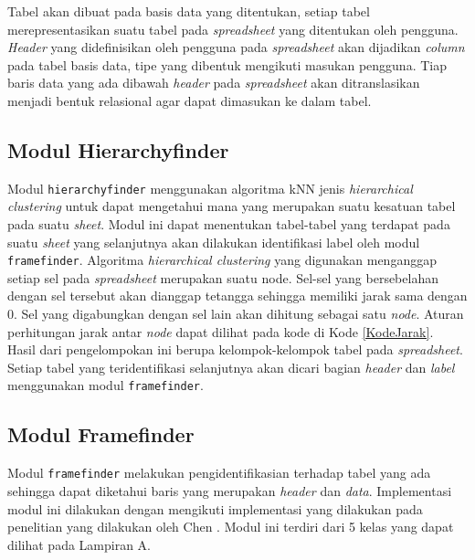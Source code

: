 Tabel akan dibuat pada basis data yang ditentukan, setiap tabel merepresentasikan suatu tabel pada \textit{spreadsheet} yang ditentukan oleh pengguna. \textit{Header} yang didefinisikan oleh pengguna pada \textit{spreadsheet} akan dijadikan \textit{column} pada tabel basis data, tipe yang dibentuk mengikuti masukan pengguna. Tiap baris data yang ada dibawah \textit{header} pada \textit{spreadsheet} akan ditranslasikan menjadi bentuk relasional agar dapat dimasukan ke dalam tabel.

\subsection{Modul Hierarchyfinder}
Modul \texttt{hierarchyfinder} menggunakan algoritma kNN jenis \textit{hierarchical clustering} untuk dapat mengetahui mana yang merupakan suatu kesatuan tabel pada suatu \textit{sheet}. Modul ini dapat menentukan tabel-tabel yang terdapat pada suatu \textit{sheet} yang selanjutnya akan dilakukan identifikasi label oleh modul \texttt{framefinder}. Algoritma \textit{hierarchical clustering} yang digunakan menganggap setiap sel pada \textit{spreadsheet} merupakan suatu node. Sel-sel yang bersebelahan dengan sel tersebut akan dianggap tetangga sehingga memiliki jarak sama dengan 0. Sel yang digabungkan dengan sel lain akan dihitung sebagai satu \textit{node}. Aturan perhitungan jarak antar \textit{node} dapat dilihat pada kode di Kode \ref{KodeJarak}.\\



Hasil dari pengelompokan ini berupa kelompok-kelompok tabel pada \textit{spreadsheet}. Setiap tabel yang teridentifikasi selanjutnya akan dicari bagian \textit{header} dan \textit{label} menggunakan modul \texttt{framefinder}.

\subsection{Modul Framefinder}
Modul \texttt{framefinder} melakukan pengidentifikasian terhadap tabel yang ada sehingga dapat diketahui baris yang merupakan \textit{header} dan \textit{data}. Implementasi modul ini dilakukan dengan mengikuti implementasi yang dilakukan pada penelitian yang dilakukan oleh Chen \citep{Chen2013}. Modul ini terdiri dari 5 kelas yang dapat dilihat pada Lampiran A.

